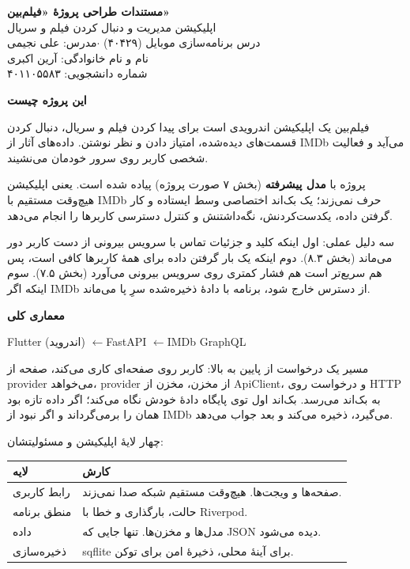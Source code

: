 \documentclass[12pt]{article}
\newcommand{\en}[1]{\textenglish{#1}}
\newcommand{\heading}[1]{%
  \par
  \vskip 0pt plus 7\baselineskip\penalty -100\vskip 0pt plus -7\baselineskip
  \vspace{1.2em}%
  {\Large\bfseries #1}%
  \par\vspace{0.6em}%
  \nobreak
}
\newcommand{\sub}[1]{%
  \par\vspace{0.8em}{\large\bfseries #1}\par\vspace{0.35em}\nobreak
}
\begin{document}
\begin{center}
{\Large\bfseries مستندات طراحی پروژهٔ «فیلم‌بین»}\\[0.4em]
{\large اپلیکیشن مدیریت و دنبال کردن فیلم و سریال}\\[0.8em]
درس برنامه‌سازی موبایل (۴۰۴۲۹) \enspace$\cdot$\enspace مدرس: علی نجیمی\\[0.4em]
نام و نام خانوادگی: آرین اکبری\\
شماره دانشجویی: ۴۰۱۱۰۵۵۸۳
\end{center}

\heading{این پروژه چیست}

فیلم‌بین یک اپلیکیشن اندرویدی است برای پیدا کردن فیلم و سریال، دنبال کردن قسمت‌های دیده‌شده،
امتیاز دادن و نظر نوشتن. داده‌های آثار از \en{IMDb} می‌آید و فعالیت شخصی کاربر روی سرور خودمان
می‌نشیند.

پروژه با \textbf{مدل پیشرفته} (بخش ۷ صورت پروژه) پیاده شده است. یعنی اپلیکیشن هیچ‌وقت مستقیم
با \en{IMDb} حرف نمی‌زند؛ یک بک‌اند اختصاصی وسط ایستاده و کار گرفتن داده، یکدست‌کردنش،
نگه‌داشتنش و کنترل دسترسی کاربرها را انجام می‌دهد.

\sub{چرا این مدل}

سه دلیل عملی: اول اینکه کلید و جزئیات تماس با سرویس بیرونی از دست کاربر دور می‌ماند (بخش \textenglish{۸.۳}).
دوم اینکه یک بار گرفتن داده برای همهٔ کاربرها کافی است، پس هم سریع‌تر است هم فشار کمتری روی
سرویس بیرونی می‌آورد (بخش \textenglish{۷.۵}). سوم اینکه اگر \en{IMDb} از دسترس خارج شود، برنامه با دادهٔ
ذخیره‌شده سرِ پا می‌ماند.

\heading{معماری کلی}

\begin{center}
\en{Flutter} (اندروید) \quad$\longleftarrow$\quad \en{FastAPI} \quad$\longleftarrow$\quad \en{IMDb GraphQL}
\end{center}

مسیر یک درخواست از پایین به بالا: کاربر روی صفحه‌ای کاری می‌کند، صفحه از \en{provider} می‌خواهد،
\en{provider} از مخزن، مخزن از \en{ApiClient}، و درخواست روی \en{HTTP} به بک‌اند می‌رسد. بک‌اند
اول توی پایگاه دادهٔ خودش نگاه می‌کند؛ اگر داده تازه بود همان را برمی‌گرداند و اگر نبود از
\en{IMDb} می‌گیرد، ذخیره می‌کند و بعد جواب می‌دهد.

چهار لایهٔ اپلیکیشن و مسئولیتشان:

\begin{center}
\begin{tabular}{|l|p{9.5cm}|}
\hline
\textbf{لایه} & \textbf{کارش} \\
\hline
رابط کاربری & صفحه‌ها و ویجت‌ها. هیچ‌وقت مستقیم شبکه صدا نمی‌زند. \\
\hline
منطق برنامه & حالت، بارگذاری و خطا با \en{Riverpod}. \\
\hline
داده & مدل‌ها و مخزن‌ها. تنها جایی که \en{JSON} دیده می‌شود. \\
\hline
ذخیره‌سازی & \en{sqflite} برای آینهٔ محلی، ذخیرهٔ امن برای توکن. \\
\hline
\end{tabular}
\end{center}
\end{document}
